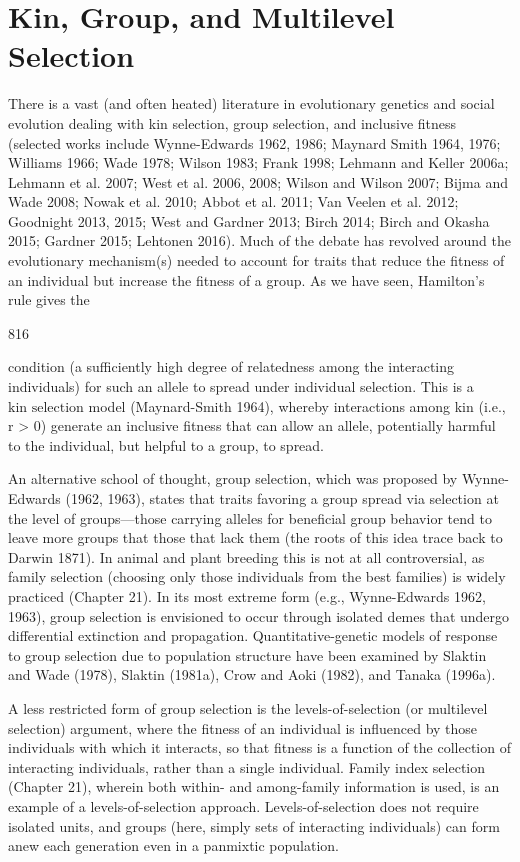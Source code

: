 \documentclass{article}
\begin{document}
\section{Kin, Group, and Multilevel Selection}
There is a vast (and often heated) literature in evolutionary genetics and social evolution dealing with kin selection, group selection, and inclusive fitness (selected works include Wynne-Edwards 1962, 1986; Maynard Smith 1964, 1976; Williams 1966; Wade 1978; Wilson 1983; Frank 1998; Lehmann and Keller 2006a; Lehmann et al. 2007; West et al. 2006, 2008; Wilson and Wilson 2007; Bijma and Wade 2008; Nowak et al. 2010; Abbot et al. 2011; Van Veelen et al. 2012; Goodnight 2013, 2015; West and Gardner 2013; Birch 2014; Birch and Okasha 2015; Gardner 2015; Lehtonen 2016). Much of the debate has revolved around the evolutionary mechanism(s) needed to account for traits that reduce the fitness of an individual but increase the fitness of a group. As we have seen, Hamilton's rule gives the

816

condition (a sufficiently high degree of relatedness among the interacting individuals) for such an allele to spread under individual selection. This is a  $ \text{kin selection} $ model (Maynard-Smith 1964), whereby interactions among kin (i.e., r > 0) generate an inclusive fitness that can allow an allele, potentially harmful to the individual, but helpful to a group, to spread.

An alternative school of thought, group selection, which was proposed by Wynne-Edwards (1962, 1963), states that traits favoring a group spread via selection at the level of groups—those carrying alleles for beneficial group behavior tend to leave more groups that those that lack them (the roots of this idea trace back to Darwin 1871). In animal and plant breeding this is not at all controversial, as family selection (choosing only those individuals from the best families) is widely practiced (Chapter 21). In its most extreme form (e.g., Wynne-Edwards 1962, 1963), group selection is envisioned to occur through isolated demes that undergo differential extinction and propagation. Quantitative-genetic models of response to group selection due to population structure have been examined by Slaktin and Wade (1978), Slaktin (1981a), Crow and Aoki (1982), and Tanaka (1996a).

A less restricted form of group selection is the levels-of-selection (or multilevel selection) argument, where the fitness of an individual is influenced by those individuals with which it interacts, so that fitness is a function of the collection of interacting individuals, rather than a single individual. Family index selection (Chapter 21), wherein both within- and among-family information is used, is an example of a levels-of-selection approach. Levels-of-selection does not require isolated units, and groups (here, simply sets of interacting individuals) can form anew each generation even in a panmixtic population.
\end{document}

